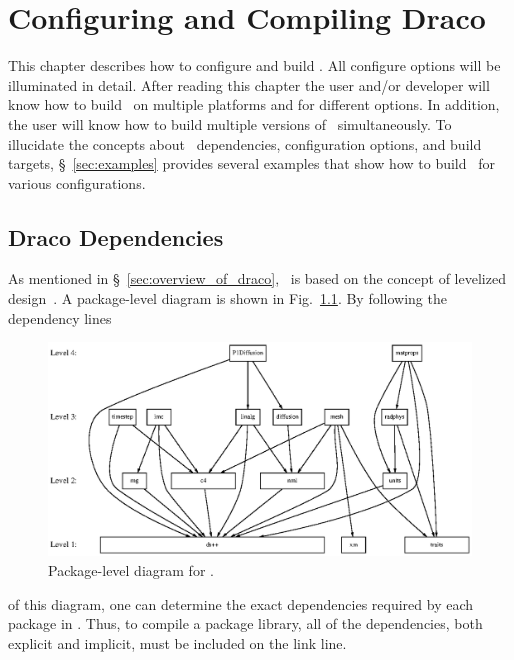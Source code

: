 
\chapter{Configuring and Compiling Draco}
\label{chap:compile}

This chapter describes how to configure and build \draco.  All
configure options will be illuminated in detail.  After reading this
chapter the user and/or developer will know how to build \draco\ on
multiple platforms and for different options.  In addition, the user
will know how to build multiple versions of \draco\ simultaneously.
To illucidate the concepts about \draco\ dependencies, configuration
options, and build targets, \S~\ref{sec:examples} provides several
examples that show how to build \draco\ for various configurations.


\section{Draco Dependencies}
\label{sec:draco_dependencies}

As mentioned in \S~\ref{sec:overview_of_draco}, \draco\ is based on
the concept of levelized design~\cite{la96}.  A package-level diagram
is shown in Fig.~\ref{fig:level}.  By following the dependency lines
\begin{figure}
  \centerline{\includegraphics{fig/level.eps}}
  \caption{Package-level diagram for \draco.}
  \label{fig:level}
\end{figure}
of this diagram, one can determine the exact dependencies required by
each package in \draco.  Thus, to compile a package library, all of
the dependencies, both explicit and implicit, must be included on the
link line.


